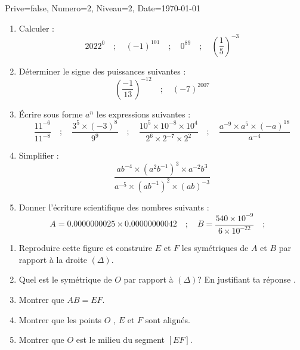 \documentclass[a4paper,12pt]{article}
\begin{document}
\begin{Maquette}[DM]{Prive=false, Numero=2, Niveau=2, Date=\today}

\begin{exercice}
\begin{enumerate}
\item Calculer : 
\[ 2022^{0} \quad; \quad (-1)^{101} \quad; \quad 0^{89} \quad; \quad (\dfrac{1}{5})^{-3}\]
\item Déterminer le signe des puissances suivantes :
\[ (\dfrac{-1}{13})^{-12} \quad; \quad 
	(-7)^{2007}
\] 
\item Écrire sous forme $a^{n}$ les expressions suivantes :
\[\dfrac{11^{-6}}{11^{-8}}\quad; \quad
	\dfrac{3^{5}\times (-3)^{8}}{9^{9}}\quad; \quad
	\dfrac{10^{5}\times 10^{-8}\times 10^{4}}{2^{6}\times 2^{-7}\times 2^{2}}\quad; \quad
\dfrac{a^{-9}\times a^{5}\times (-a)^{18}}{a^{-4}}
\]
\item Simplifier : 
\[
\dfrac{ab^{-4}\times (a^{2}b^{-1})^{3}\times a^{-2}b^{3}}{a^{-5}\times (ab^{-1})^{2}\times (ab)^{-3}}
\]
\item Donner l'écriture scientifique des nombres suivants :
\[
	A=0.0000000025\times 0.00000000042 \quad; \quad
	B=\dfrac{540\times 10^{-9}}{6\times 10^{-22}}\quad; \quad
\]
\end{enumerate}
\end{exercice}

\begin{exercice}
\begin{minipage}{.5\textwidth}
\begin{enumerate}
\item Reproduire cette figure et construire $E$ et $F$ les symétriques de $A$ et $B$ par rapport à la droite  $(\Delta)$.
\item Quel est le symétrique de $O$ par rapport à $(\Delta)$? En justifiant ta réponse .
\item Montrer que $AB=EF$.
\item Montrer que les points $O$ , $E$ et $F$ sont alignés.
\item Montrer que $O$ est le milieu du segment $[EF]$.
\end{enumerate}
\end{minipage}
\begin{minipage}{.5\textwidth}
\end{minipage}
\end{exercice}
\end{Maquette}
\end{document}
